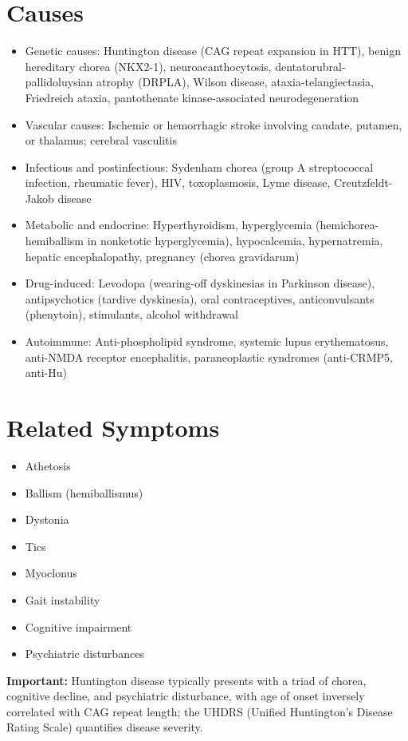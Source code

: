 \section*{Causes}
\begin{itemize}
  \item Genetic causes: Huntington disease (CAG repeat expansion in HTT), benign hereditary chorea (NKX2-1), neuroacanthocytosis, dentatorubral-pallidoluysian atrophy (DRPLA), Wilson disease, ataxia-telangiectasia, Friedreich ataxia, pantothenate kinase-associated neurodegeneration
  \item Vascular causes: Ischemic or hemorrhagic stroke involving caudate, putamen, or thalamus; cerebral vasculitis
  \item Infectious and postinfectious: Sydenham chorea (group A streptococcal infection, rheumatic fever), HIV, toxoplasmosis, Lyme disease, Creutzfeldt-Jakob disease
  \item Metabolic and endocrine: Hyperthyroidism, hyperglycemia (hemichorea-hemiballism in nonketotic hyperglycemia), hypocalcemia, hypernatremia, hepatic encephalopathy, pregnancy (chorea gravidarum)
  \item Drug-induced: Levodopa (wearing-off dyskinesias in Parkinson disease), antipsychotics (tardive dyskinesia), oral contraceptives, anticonvulsants (phenytoin), stimulants, alcohol withdrawal
  \item Autoimmune: Anti-phospholipid syndrome, systemic lupus erythematosus, anti-NMDA receptor encephalitis, paraneoplastic syndromes (anti-CRMP5, anti-Hu)
\end{itemize}

\section*{Related Symptoms}
\begin{itemize}
  \item Athetosis
  \item Ballism (hemiballismus)
  \item Dystonia
  \item Tics
  \item Myoclonus
  \item Gait instability
  \item Cognitive impairment
  \item Psychiatric disturbances
\end{itemize}
\textbf{Important:} Huntington disease typically presents with a triad of chorea, cognitive decline, and psychiatric disturbance, with age of onset inversely correlated with CAG repeat length; the UHDRS (Unified Huntington's Disease Rating Scale) quantifies disease severity.

